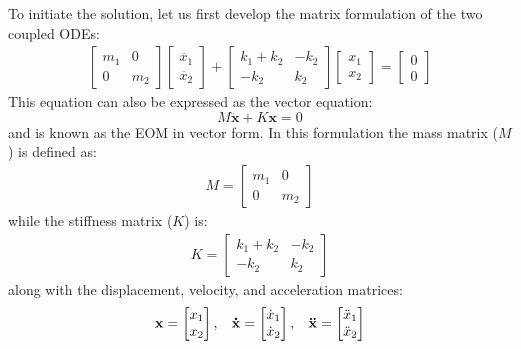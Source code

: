 \documentclass[12pt,letter]{article}
\numberwithin{ex}{section} %
\numberwithin{re}{section} %
\begin{document}
To initiate the solution, let us first develop the matrix formulation of the two coupled ODEs:
\begin{eqnarray}
  \begin{bmatrix} m_1 & 0  \\  0 & m_2 \end{bmatrix}\begin{bmatrix} \ddot{x_1} \\  \ddot{x_2} \end{bmatrix} + \begin{bmatrix} k_1+k_2 & -k_2  \\  -k_2 & k_2 \end{bmatrix}\begin{bmatrix} x_1 \\  x_2 \end{bmatrix} = \begin{bmatrix} 0 \\  0 \end{bmatrix}
\end{eqnarray}
This equation can also be expressed as the vector equation:
\begin{equation}
M\mathbf{\ddot{x}} + K\mathbf{x} =0
\end{equation}
and is known as the EOM in vector form. In this formulation the mass matrix ($M$) is defined as:
\begin{eqnarray}
 M=  \begin{bmatrix} m_1 & 0  \\  0 & m_2 \end{bmatrix}  
\end{eqnarray}
while the stiffness matrix ($K$) is:
\begin{eqnarray}
 K=  \begin{bmatrix} k_1+k_2 & -k_2  \\  -k_2 & k_2 \end{bmatrix}
\end{eqnarray}
along with the displacement, velocity, and acceleration matrices:
\begin{eqnarray}
 \mathbf{x}=  \begin{bmatrix} x_1 \\  x_2 \end{bmatrix} , \hspace{2ex} \mathbf{\dot{x}}=  \begin{bmatrix} \dot{x}_1 \\  \dot{x}_2 \end{bmatrix}, \hspace{2ex} \mathbf{\ddot{x}}=  \begin{bmatrix} \ddot{x}_1 \\  \ddot{x}_2 \end{bmatrix}
\end{eqnarray}
\end{document}

